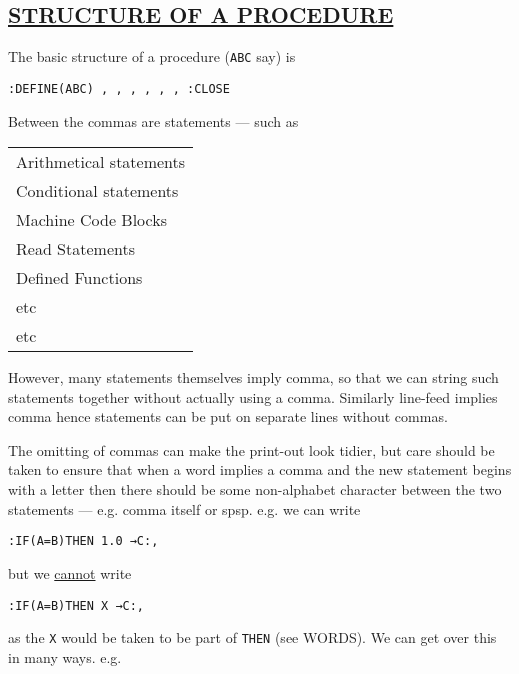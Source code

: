 \documentclass[10pt, a4paper, oneside]{article}
\newcommand{\myuline}[1]{\uline{#1}}
\newcommand{\mytt}[1]{\texttt{\scriptsize #1}}
\newcommand{\mytt}[1]{\texttt{\small #1}}
\begin{document}
\begin{multicols}{2}
\section{\myuline{STRUCTURE OF A PROCEDURE}}

The basic structure of a procedure (\mytt{ABC} say) is

\begin{addmargin}[1cm]{1em}%
\begin{lstlisting}
:DEFINE(ABC) , , , , , , :CLOSE
\end{lstlisting}
\end{addmargin}

Between the commas are statements — such as

\begin{tabular}{l}
Arithmetical statements \\
Conditional statements \\
Machine Code Blocks \\
Read Statements \\
Defined Functions \\
etc \\
etc \\
\end{tabular}

However, many statements themselves imply comma,
so that we can string such statements together without
actually using a comma.  Similarly line-feed implies
comma hence statements can be put on separate lines without commas.

The omitting of commas can make the print-out look
tidier, but care should be taken to ensure that when a
word implies a comma and the new statement begins with
a letter then there should be some non-alphabet
character between the two statements — e.g. comma itself
or spsp. e.g. we can write

\begin{addmargin}[1cm]{1em}%
\begin{lstlisting}
:IF(A=B)THEN 1.0 →C:,
\end{lstlisting}
\end{addmargin}

but we \myuline{cannot} write

\begin{addmargin}[1cm]{1em}%
\begin{lstlisting}
:IF(A=B)THEN X →C:,
\end{lstlisting}
\end{addmargin}

as the \mytt{X} would be taken to be part of \mytt{THEN} (see
WORDS).  We can get over this in many ways.  e.g.


\end{multicols}
\end{document}
